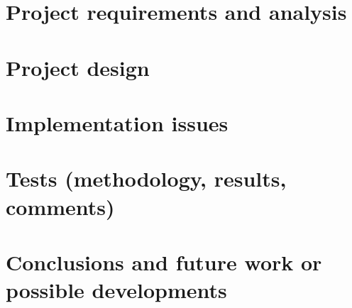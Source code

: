 \documentclass[]{usiinfbachelorproject}
\begin{document}
\section{Project requirements and analysis} \label{projectRequirementsAndAnalysis}

\section{Project design} \label{projectDesign}

\section{Implementation issues} \label{implementationIssues}

\section{Tests (methodology, results, comments)} \label{tests}

\section{Conclusions and future work or possible developments} \label{conclusions}






\end{document}
